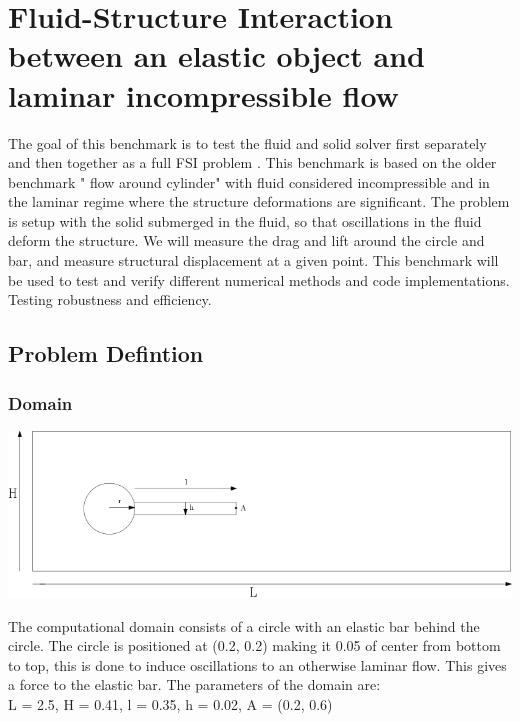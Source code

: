 \section{Fluid-Structure Interaction between an elastic object and laminar incompressible flow} \label{sec:HronTurek}
The goal of this benchmark is to test the fluid and solid solver first separately and then together as a full FSI problem \cite{Hron2006a}. This benchmark is based on the older benchmark " flow around cylinder" with fluid considered incompressible and in the laminar regime where the structure deformations are significant. The problem is setup with the solid submerged in the fluid, so that oscillations in the fluid deform the structure. We will measure the drag and lift around the circle and bar, and measure structural displacement at a given point. This benchmark will be used to test and verify different numerical methods and code implementations. Testing robustness and efficiency. 



\subsection{Problem Defintion}
\subsubsection*{Domain}

\begin{center}
\includegraphics[scale=0.4]{./Verification_Validation/Hron_Turek/Domain_drawing.png}
\end{center}

The computational domain consists of a circle with an elastic bar behind the circle. The circle is positioned at (0.2, 0.2) making it 0.05 of center from bottom to top, this is done to induce oscillations to an otherwise laminar flow. 
This gives a force to the elastic bar. The parameters of the domain are:\\
L = 2.5, H = 0.41, l = 0.35, h = 0.02, A = (0.2, 0.6) \\

